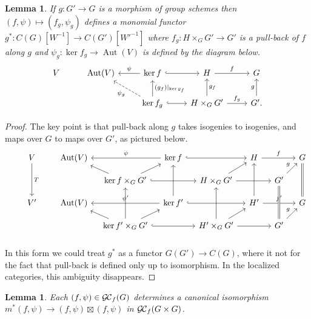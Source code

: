 \documentclass[11pt]{amsart}
\theoremstyle{plain}
\newtheorem{lemma}[theorem]{Lemma}
\theoremstyle{definition}
\theoremstyle{remark}
\DeclareMathOperator{\Aut}{Aut}
\newcommand{\GC}{{\mathcal{G\hskip-0.8pt C}}}
\newcommand{\GCf}{{\GC_f}}
\begin{document}
\begin{lemma}\label{lemma:finite-pull-back}
If $g : G'\to G$ is a morphism of group schemes then $(f,\psi) \mapsto (f_g,\psi_g)$ defines a monomial functor $g^* : C(G)[W^{-1}] \to C(G')[W'^{-1}]$ where $f_g : H\times_G G'\to G'$ is a pull-back of $f$ along $g$ and $\psi_g : \ker f_g \to \Aut(V)$ is defined by the diagram below.
\[
\begin{tikzcd}
V & \Aut(V) & \arrow[swap]{l}{\psi} \ker f \arrow[hook]{r} & H \arrow{r}{f} &  G\\
  &  & \arrow[dashed]{ul}{\psi_g} \arrow[swap]{u}{(g_f)\vert_{\ker g_f}} \ker f_g \arrow[hook]{r} & \arrow[swap]{u}{g_f} H\times_G G' \arrow{r}{f_g} & \arrow{u}{g} G'.
\end{tikzcd}
\]
\end{lemma}

\begin{proof}
The key point is that pull-back along $g$ takes isogenies to isogenies, and maps over $G$ to maps over $G'$, as pictured below.
\[
\begin{tikzcd}[row sep=10,column sep=10]
\ & V \arrow{dd}{T} && \Aut(V) && \arrow[swap]{ll}{\psi} \ker f \arrow[hook]{rr} && H \arrow{rr}{f} && \arrow[equal]{dd} G\\
 && && \arrow{ul} \ker f\times_G G' \arrow{ur} \arrow[hook]{rr} && H\times_G G' \arrow{ur} \arrow{rr} && G' \arrow{ur}{g} & \\
& V' && \Aut(V) && \arrow[swap]{ll}{\psi'} \arrow[swap]{uu}{} \ker f'  \arrow[hook]{rr} && \arrow[swap]{uu} H' \arrow{rr}{f'} && G\\
 && && \arrow{ul} \ker f'\times_G G' \arrow{uu} \arrow{ur} \arrow[hook]{rr} && \arrow{uu} H'\times_G G' \arrow{ur} \arrow{rr} && \arrow[equals]{uu} G' \arrow{ur}{g} & \\
\end{tikzcd}
\]
In this form we could treat $g^*$ as a functor $G(G')\to C(G)$, where it not for the fact that pull-back is defined only up to isomorphism. In the localized categories, this ambiguity disappears. 
\end{proof}


\begin{lemma}\label{lemma:finite-iso}
Each $(f,\psi)\in \GCf(G)$ determines a canonical isomorphism $m^*(f,\psi) \to (f,\psi)\boxtimes(f,\psi)$ in $\GCf(G\times G)$.
 \end{lemma}
\end{document}
